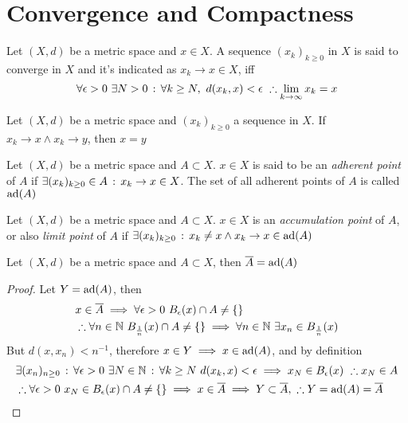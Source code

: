 \documentclass[../complete.tex]{subfiles}
\begin{document}
\section{Convergence and Compactness}
\begin{dfn}[Convergence]
	Let $(X,d)$ be a metric space and $x\in X$. A sequence $(x_k)_{k\ge0}$ in $X$ is said to converge in $X$ and it's indicated as $x_k\to x\in X$, iff
	\begin{equation*}
		\forall\epsilon>0\ \exists N>0\st\forall k\ge N,\ d(x_k,x)<\epsilon\ \therefore\lim_{k\to\infty}x_k=x
	\end{equation*}
\end{dfn}
\begin{thm}
	Let $(X,d)$ be a metric space and $(x_k)_{k\ge0}$ a sequence in $X$. If $x_k\to x\wedge x_k\to y$, then $x=y$
\end{thm}
\begin{dfn}
	Let $(X,d)$ be a metric space and $A\subset X$. $x\in X$ is said to be an \textit{adherent point} of $A$ if $\exists(x_k)_{k\ge0}\in A\, :\,  x_k\to x\in X$. The set of all adherent points of $A$ is called $\operatorname{ad}(A)$
\end{dfn}
\begin{dfn}
	Let $(X,d)$ be a metric space and $A\subset X$. $x\in X$ is an \textit{accumulation point} of $A$, or also \textit{limit point} of $A$ if $\exists(x_k)_{k\ge0}\, :\,  x_k\ne x\wedge x_k\to x\in\operatorname{ad}(A)$
\end{dfn}
\begin{prop}
	Let $(X,d)$ be a metric space and $A\subset X$, then $\overline{A}=\operatorname{ad}(A)$
\end{prop}
\begin{proof}
	Let $Y=\operatorname{ad}(A)$, then
	\begin{equation*}
		\begin{aligned}
			&x\in\cc{A}\implies\forall\epsilon>0\ B_\epsilon(x)\cap A\ne\{\}\\
			&\therefore\forall n\in\N\ B_{\frac{1}{n}}(x)\cap A\ne\{\}\implies\forall n\in\N\ \exists x_n\in B_{\frac{1}{n}}(x)
		\end{aligned}
	\end{equation*}
	But $d(x,x_n)<n^{-1}$, therefore $x\in Y\implies x\in\operatorname{ad}(A)$, and by definition
	\begin{equation*}
		\begin{aligned}
			&\exists(x_n)_{n\ge0}\st\forall\epsilon>0\ \exists N\in\N\st\forall k\ge N\ d(x_k,x)<\epsilon\implies x_N\in B_\epsilon(x)\ \therefore x_N\in A\\
			&\therefore\forall\epsilon>0\ x_N\in B_\epsilon(x)\cap A\ne\{\}\implies x\in\cc{A}\implies Y\subset\cc{A},\ \therefore Y=\ad(A)=\cc{A}
		\end{aligned}
	\end{equation*}
\end{proof}
\end{document}
